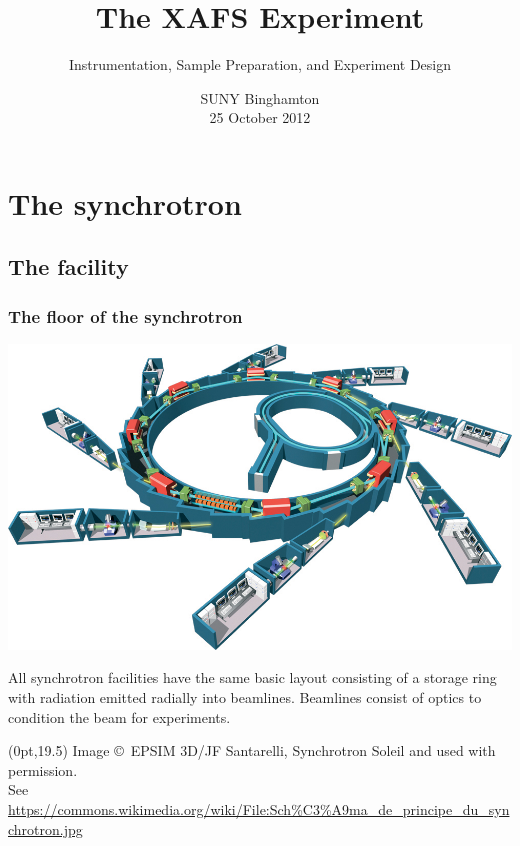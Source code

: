 \documentclass[10pt, xcolor=x11names, compress]{beamer}
\title{The XAFS Experiment}
\subtitle[]{Instrumentation, Sample Preparation, and Experiment
  Design}
\date{SUNY Binghamton\\25 October 2012}
\begin{document}
\maketitle


\section{The synchrotron}
\label{sec:synch}

\subsection{The facility}

\begin{frame}
  \frametitle{The floor of the synchrotron}
  
  \begin{center}
    \includegraphics[width=0.8\linewidth]{synch/SOL008h.jpg}
    
    \smallskip

    All synchrotron facilities have the same basic layout consisting
    of a storage ring with radiation emitted radially into beamlines.
    Beamlines consist of optics to condition the beam for experiments.
  \end{center}
  \begin{textblock*}{0.8\linewidth}(0pt,19.5\TPVertModule)%
    \tiny%
    Image \copyright\ EPSIM 3D/JF Santarelli, Synchrotron Soleil and
    used with permission.\\ See
    {\color{Blue4}\url{https://commons.wikimedia.org/wiki/File:Sch\%C3\%A9ma_de_principe_du_synchrotron.jpg}}
  \end{textblock*}
\end{frame}
\end{document}
